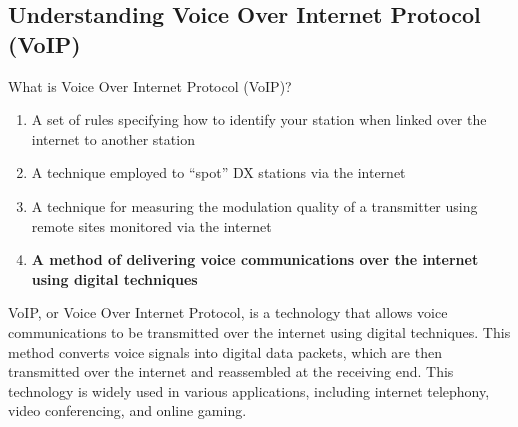 \subsection{Understanding Voice Over Internet Protocol (VoIP)}
\label{T8C07}

\begin{tcolorbox}[colback=gray!10!white,colframe=black!75!black,title=T8C07]
What is Voice Over Internet Protocol (VoIP)?
\begin{enumerate}[noitemsep]
    \item A set of rules specifying how to identify your station when linked over the internet to another station
    \item A technique employed to “spot” DX stations via the internet
    \item A technique for measuring the modulation quality of a transmitter using remote sites monitored via the internet
    \item \textbf{A method of delivering voice communications over the internet using digital techniques}
\end{enumerate}
\end{tcolorbox}

VoIP, or Voice Over Internet Protocol, is a technology that allows voice communications to be transmitted over the internet using digital techniques. This method converts voice signals into digital data packets, which are then transmitted over the internet and reassembled at the receiving end. This technology is widely used in various applications, including internet telephony, video conferencing, and online gaming.